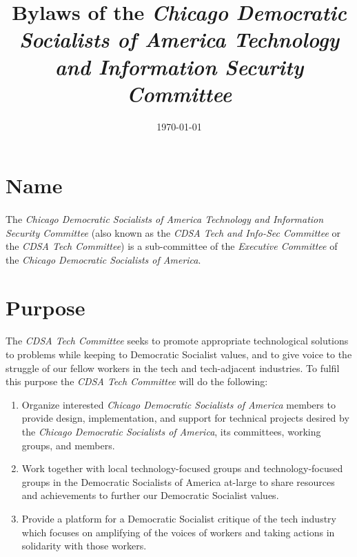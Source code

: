 \documentclass[12pt,letter,twocolumn,oneside,draft]{article}
\newcommand{\committeename}{\emph{Chicago Democratic Socialists of America Technology and Information Security Committee}}
\newcommand{\cname}{\emph{CDSA Tech Committee}}
\newcommand{\cdsa}{\emph{Chicago Democratic Socialists of America}}
\begin{document}
\title{Bylaws of the \committeename{}}
\date{\today}
\maketitle



\tableofcontents



\setcounter{secnumdepth}{5}

\section{Name}

\paragraph{}
The \committeename{} (also known as the \emph{CDSA Tech and Info-Sec Committee}
or the \cname{}) is a sub-committee of the \emph{Executive Committee} of the
\emph{Chicago Democratic Socialists of America}.


\section{Purpose}

\paragraph{}
The \cname{} seeks to promote appropriate technological solutions to problems
while keeping to Democratic Socialist values, and to give voice to the struggle
of our fellow workers in the tech and tech-adjacent industries. To fulfil this
purpose the \cname{} will do the following:

\begin{enumerate}
    \item{Organize interested \cdsa{} members to provide design,
        implementation, and support for technical projects desired by the
        \cdsa{}, its committees, working groups, and members.}
    \item{Work together with local technology-focused groups and
        technology-focused groups in the Democratic Socialists of America
        at-large to share resources and achievements to further our Democratic
        Socialist values.}
    \item{Provide a platform for a Democratic Socialist critique of the tech
        industry which focuses on amplifying of the voices of workers and
        taking actions in solidarity with those workers.}
\end{enumerate}
\end{document}
